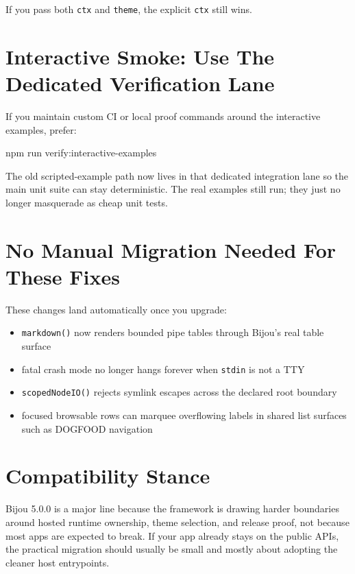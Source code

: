 If you pass both \texttt{c\allowbreak{}t\allowbreak{}x} and \texttt{t\allowbreak{}h\allowbreak{}e\allowbreak{}m\allowbreak{}e}, the explicit \texttt{c\allowbreak{}t\allowbreak{}x} still wins.

\section{Interactive Smoke: Use The Dedicated Verification Lane}\label{record-269-interactive-smoke-use-the-dedicated-verification-lane}

If you maintain custom CI or local proof commands around the interactive examples, prefer:

\begin{CodeBlock}
npm run verify:interactive-examples
\end{CodeBlock}

The old scripted-example path now lives in that dedicated integration lane so the main unit suite can stay deterministic. The real examples still run; they just no longer masquerade as cheap unit tests.

\section{No Manual Migration Needed For These Fixes}\label{record-269-no-manual-migration-needed-for-these-fixes}

These changes land automatically once you upgrade:

\begin{itemize}
\tightlist
\item
  \texttt{m\allowbreak{}a\allowbreak{}r\allowbreak{}k\allowbreak{}d\allowbreak{}o\allowbreak{}w\allowbreak{}n\allowbreak{}(\allowbreak{})} now renders bounded pipe tables through Bijou's real table surface
\item
  fatal crash mode no longer hangs forever when \texttt{s\allowbreak{}t\allowbreak{}d\allowbreak{}i\allowbreak{}n} is not a TTY
\item
  \texttt{s\allowbreak{}c\allowbreak{}o\allowbreak{}p\allowbreak{}e\allowbreak{}d\allowbreak{}N\allowbreak{}o\allowbreak{}d\allowbreak{}e\allowbreak{}I\allowbreak{}O\allowbreak{}(\allowbreak{})} rejects symlink escapes across the declared root boundary
\item
  focused browsable rows can marquee overflowing labels in shared list surfaces such as DOGFOOD navigation
\end{itemize}

\section{Compatibility Stance}\label{record-269-compatibility-stance}

Bijou 5.0.0 is a major line because the framework is drawing harder boundaries around hosted runtime ownership, theme selection, and release proof, not because most apps are expected to break. If your app already stays on the public APIs, the practical migration should usually be small and mostly about adopting the cleaner host entrypoints.

